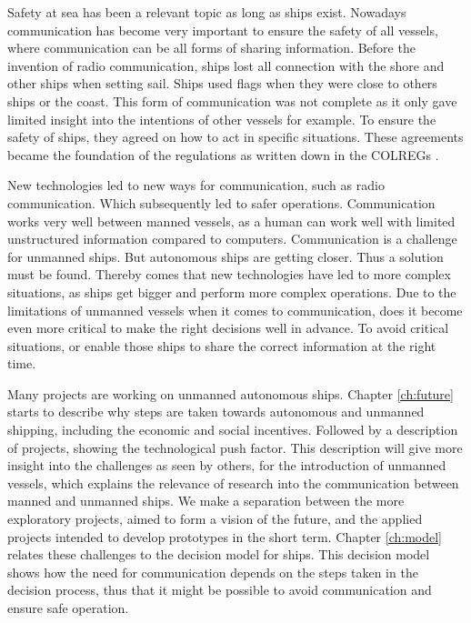 Safety at sea has been a relevant topic as long as ships exist. Nowadays communication has become very important to ensure the safety of all vessels, where communication can be all forms of sharing information. Before the invention of radio communication, ships lost all connection with the shore and other ships when setting sail. Ships used flags when they were close to others ships or the coast. This form of communication was not complete as it only gave limited insight into the intentions of other vessels for example. To ensure the safety of ships, they agreed on how to act in specific situations. These agreements became the foundation of the regulations as written down in the \acf{COLREGs} \cite{IMO1972}.

New technologies led to new ways for communication, such as radio communication. Which subsequently led to safer operations. Communication works very well between manned vessels, as a human can work well with limited unstructured information compared to computers. Communication is a challenge for unmanned ships. But autonomous ships are getting closer. Thus a solution must be found. Thereby comes that new technologies have led to more complex situations, as ships get bigger and perform more complex operations. Due to the limitations of unmanned vessels when it comes to communication, does it become even more critical to make the right decisions well in advance. To avoid critical situations, or enable those ships to share the correct information at the right time.

Many projects are working on unmanned autonomous ships. Chapter \ref{ch:future} starts to describe why steps are taken towards autonomous and unmanned shipping, including the economic and social incentives. Followed by a description of projects, showing the technological push factor. This description will give more insight into the challenges as seen by others, for the introduction of unmanned vessels, which explains the relevance of research into the communication between manned and unmanned ships. We make a separation between the more exploratory projects, aimed to form a vision of the future, and the applied projects intended to develop prototypes in the short term.
Chapter \ref{ch:model} relates these challenges to the decision model for ships. This decision model shows how the need for communication depends on the steps taken in the decision process, thus that it might be possible to avoid communication and ensure safe operation.